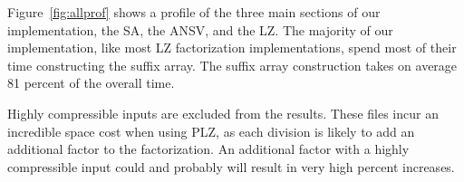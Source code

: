 Figure~\ref{fig:allprof} shows a profile of the three main sections of our implementation, the SA, the ANSV, and the LZ.
The majority of our implementation, like most LZ factorization implementations, spend most of their time constructing the suffix array.
The suffix array construction takes on average 81 percent of the overall time.

Highly compressible inputs are excluded from the results.
These files incur an incredible space cost when using PLZ, as each division is likely to add an additional factor to the factorization.
An additional factor with a highly compressible input could and probably will result in very high percent increases.
